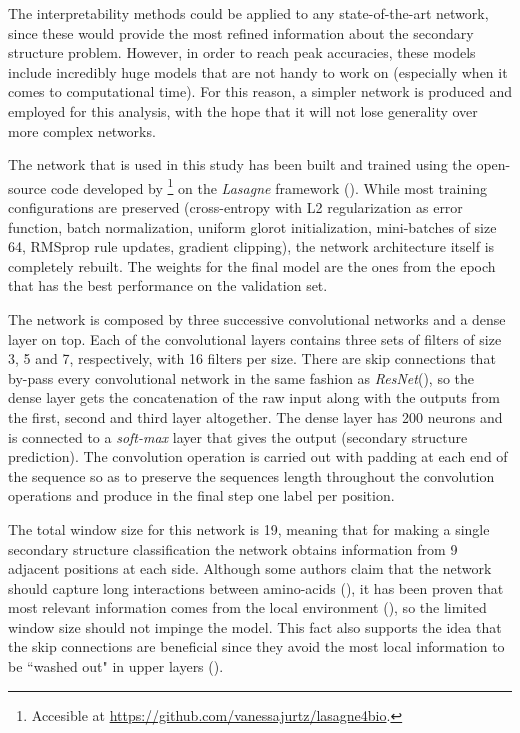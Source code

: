 The interpretability methods could be applied to any state-of-the-art network, since these would provide the most refined information about the secondary structure problem. However, in order to reach peak accuracies, these models include incredibly huge models that are not handy to work on (especially when it comes to computational time). For this reason, a simpler network is produced and employed for this analysis, with the hope that it will not lose generality over more complex networks.

The network that is used in this study has been built and trained using the open-source code developed by \cite{Jurtz2017}\footnote{Accesible at \url{https://github.com/vanessajurtz/lasagne4bio}.} on the \textit{Lasagne} framework (\cite{Dieleman2015}). While most training configurations are preserved (cross-entropy with L2 regularization as error function, batch normalization, uniform glorot initialization, mini-batches of size 64, RMSprop rule updates, gradient clipping), the network architecture itself is completely rebuilt. The weights for the final model are the ones from the epoch that has the best performance on the validation set.

The network is composed by three successive convolutional networks and a dense layer on top. Each of the convolutional layers contains three sets of filters of size 3, 5 and 7, respectively, with 16 filters per size. There are skip connections that by-pass every convolutional network in the same fashion as \textit{ResNet}(\cite{He2015}), so the dense layer gets the concatenation of the raw input along with the outputs from the first, second and third layer altogether.
The dense layer has 200 neurons and is connected to a \textit{soft-max} layer that gives the output (secondary structure prediction). The convolution operation is carried out with padding at each end of the sequence so as to preserve the sequences length throughout the convolution operations and produce in the final step one label per position.


The total window size for this network is 19, meaning that for making a single secondary structure classification the network obtains information from 9 adjacent positions at each side. Although some authors claim that the network should capture long interactions between amino-acids (\cite{Li2016,Lin2016,Hattori2017,Heffernan2017}), it has been proven that most relevant information comes from the local environment (\cite{Busia2017}), so the limited window size should not impinge the model. This fact also supports the idea that the skip connections are beneficial since they avoid the most local information to be ``washed out" in upper layers (\cite{Busia2017}).

